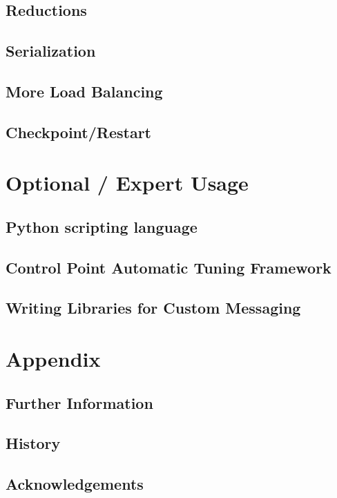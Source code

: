 \documentclass[10pt]{report}
\begin{document}
\chapter{Reductions}
  
  

\chapter{Serialization}
  

\chapter{More Load Balancing}
  

\chapter{Checkpoint/Restart}
\label{sec:checkpoint}
  

      
%  


\part{Optional / Expert Usage}

\chapter{Python scripting language}
\label{python}
  

\chapter{Control Point Automatic Tuning Framework}
\label{sec:controlpoint}
  

\chapter{Writing Libraries for Custom Messaging}
  

%


\part{Appendix}
\appendix

%

\chapter{Further Information}
  

\chapter{History}
  

\chapter {Acknowledgements}
  


\end{document}
